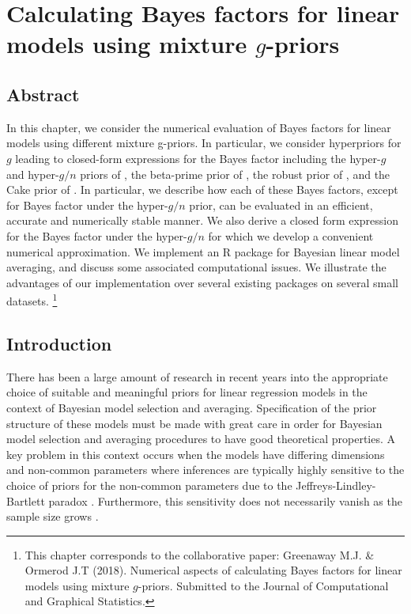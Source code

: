 
\chapter{Calculating Bayes factors for linear models using
	mixture $g$-priors
	}



\section*{Abstract}

\noindent In this chapter, we consider the numerical evaluation of Bayes
factors for linear models using different mixture g-priors. In particular, we
consider hyperpriors for $g$ leading to closed-form expressions for the Bayes
factor including the hyper-$g$ and hyper-$g/n$ priors of \cite{Liang2008}, the
beta-prime prior of \cite{Maruyama2011}, the robust prior of
\cite{Bayarri2012}, and the Cake prior of \cite{OrmerodEtal2017}. In
particular, we describe how each of these Bayes factors, except for Bayes
factor under the hyper-$g/n$ prior, can be evaluated in an efficient, accurate
and numerically stable manner. We also derive a closed form expression for the
Bayes factor under the hyper-$g/n$ for which we develop a convenient numerical
approximation. We implement an R package for Bayesian linear model averaging,
and discuss some associated computational issues. We illustrate the advantages
of our implementation over several existing packages on several small datasets.
 \footnote{This chapter corresponds to the collaborative paper:  
 	Greenaway M.J. \& Ormerod J.T (2018).
 	Numerical aspects of calculating Bayes factors for linear models using mixture $g$-priors. Submitted to the Journal of Computational and Graphical Statistics.}

 
\section{Introduction}

 
There has been a large amount of research in recent years into the appropriate
choice of suitable and meaningful priors for linear regression models in the
context of Bayesian model selection and averaging. Specification of the prior
structure of these models must be made with great care in order for Bayesian
model selection and averaging procedures to have good theoretical properties.
A key problem in this context occurs when the models have differing dimensions
and non-common parameters where inferences are typically highly sensitive to
the choice of priors for the non-common parameters due to the
Jeffreys-Lindley-Bartlett paradox
\citep{Lindley1957,Bartlett1957,OrmerodEtal2017}.  Furthermore, this
sensitivity does not necessarily vanish as the sample size grows
\citep{Kass1995,Berger2001}.  

